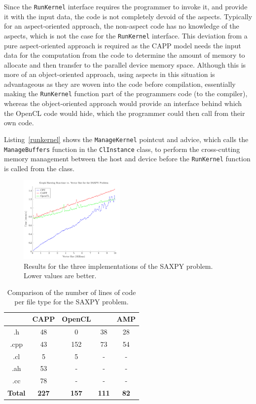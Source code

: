 \documentclass{sig-alternate-05-2015}
\begin{document}
Since the \lstinline$RunKernel$ interface requires the programmer to invoke it, and provide it with the input
data, the \CPP code
is not completely devoid of the aspects. Typically for an aspect-oriented approach, the non-aspect code has no
knowledge of the aspects, which is not the case for the \lstinline$RunKernel$ interface. This deviation from a
pure aspect-oriented approach is required as the CAPP model needs the input data for the computation from
the \CPP code to determine the amount of memory to allocate and then transfer to the parallel device memory
space. Although this is more of an object-oriented approach, using aspects in this situation is advantageous
as they are woven into the code before compilation, essentially making the \lstinline$RunKernel$ function part
of the programmers \CPP code (to the compiler), whereas the object-oriented approach would provide an
interface behind which the OpenCL code would hide, which the programmer could then call from their own code.

Listing~\ref{runkernel} shows the \lstinline$ManageKernel$ pointcut and advice,
which calls the \lstinline$ManageBuffers$ function in the \lstinline$ClInstance$
class, to perform the cross-cutting memory management between the host and
device before the \lstinline$RunKernel$ function is called from the \CPP
class.

\begin{figure}[!t]
	\centering
	\includegraphics[width=0.46\textwidth]{Saxpy}
	\caption{Results for the three implementations of the SAXPY problem. Lower
	values are better.}
	\label{fig:saxpy}
\end{figure}

\begin{table}[!b]
\centering
\caption{Comparison of the number of lines of code per file type for the SAXPY
problem.}
\label{tab:saxpy}
\begin{tabular}{|c|c|c|c|c|} 
	\hline
				    & CAPP			& OpenCL		& \CPP	    & \CPP AMP      \\ \hline
    .h				& 48			& 0				& 38	    & 28            \\ \hline
    .cpp			& 43			& 152			& 73	    & 54            \\ \hline
    .cl				& 5				& 5				& -		    & -             \\ \hline
    .ah				& 53			& -				& -		    & -             \\ \hline
    .cc				& 78			& -				& -		    & -             \\ \hline
    \textbf{Total}	& \textbf{227}	& \textbf{157}	& \textbf{111}	& \textbf{82}	\\ \hline		
\hline
\end{tabular}
\end{table}
\end{document}

